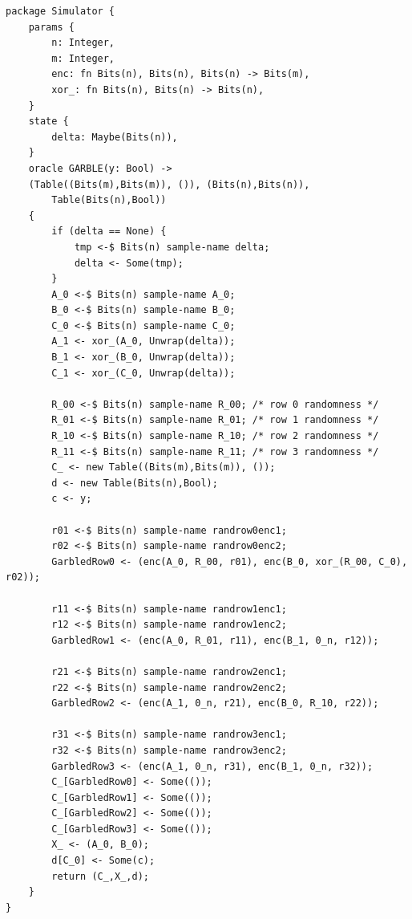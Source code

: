 \begin{longlisting}
\begin{verbatim}
package Simulator {
    params {
        n: Integer,
        m: Integer, 
        enc: fn Bits(n), Bits(n), Bits(n) -> Bits(m),
        xor_: fn Bits(n), Bits(n) -> Bits(n),
    }
    state {
        delta: Maybe(Bits(n)),
    }
    oracle GARBLE(y: Bool) -> 
    (Table((Bits(m),Bits(m)), ()), (Bits(n),Bits(n)),
        Table(Bits(n),Bool))
    {
        if (delta == None) {
            tmp <-$ Bits(n) sample-name delta;
            delta <- Some(tmp);
        }         
        A_0 <-$ Bits(n) sample-name A_0;
        B_0 <-$ Bits(n) sample-name B_0;
        C_0 <-$ Bits(n) sample-name C_0;
        A_1 <- xor_(A_0, Unwrap(delta));
        B_1 <- xor_(B_0, Unwrap(delta));
        C_1 <- xor_(C_0, Unwrap(delta));
        
        R_00 <-$ Bits(n) sample-name R_00; /* row 0 randomness */
        R_01 <-$ Bits(n) sample-name R_01; /* row 1 randomness */
        R_10 <-$ Bits(n) sample-name R_10; /* row 2 randomness */
        R_11 <-$ Bits(n) sample-name R_11; /* row 3 randomness */
        C_ <- new Table((Bits(m),Bits(m)), ());
        d <- new Table(Bits(n),Bool);
        c <- y;
        
        r01 <-$ Bits(n) sample-name randrow0enc1;
        r02 <-$ Bits(n) sample-name randrow0enc2;
        GarbledRow0 <- (enc(A_0, R_00, r01), enc(B_0, xor_(R_00, C_0), r02));
        
        r11 <-$ Bits(n) sample-name randrow1enc1;
        r12 <-$ Bits(n) sample-name randrow1enc2;
        GarbledRow1 <- (enc(A_0, R_01, r11), enc(B_1, 0_n, r12));
        
        r21 <-$ Bits(n) sample-name randrow2enc1;
        r22 <-$ Bits(n) sample-name randrow2enc2;
        GarbledRow2 <- (enc(A_1, 0_n, r21), enc(B_0, R_10, r22));
        
        r31 <-$ Bits(n) sample-name randrow3enc1;
        r32 <-$ Bits(n) sample-name randrow3enc2;
        GarbledRow3 <- (enc(A_1, 0_n, r31), enc(B_1, 0_n, r32));
        C_[GarbledRow0] <- Some(());
        C_[GarbledRow1] <- Some(());
        C_[GarbledRow2] <- Some(());
        C_[GarbledRow3] <- Some(());
        X_ <- (A_0, B_0);
        d[C_0] <- Some(c);
        return (C_,X_,d);
    }
}
\end{verbatim}
\caption{Package }
\label{lst:domino-package-simulator}
\end{longlisting}